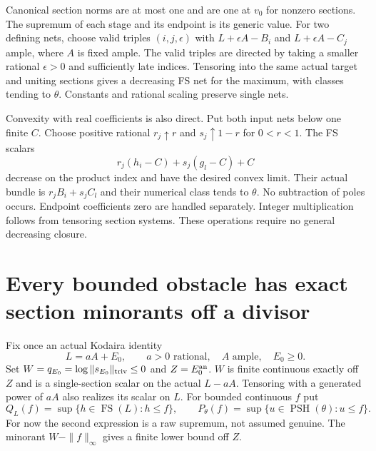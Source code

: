 \documentclass[10pt]{article}
\newcommand{\PSH}{\operatorname{PSH}}
\newcommand{\FS}{\operatorname{FS}}
\begin{document}
Canonical section norms are at most one and are one at $v_0$ for nonzero
sections. The supremum of each stage and its endpoint is its generic value.
For two defining nets, choose valid triples $(i,j,\epsilon)$ with
$L+\epsilon A-B_i$ and $L+\epsilon A-C_j$ ample, where $A$ is fixed ample.
The valid triples are directed by taking a smaller rational $\epsilon>0$
and sufficiently late indices. Tensoring into the same actual target and
uniting sections gives a decreasing FS net for the maximum, with classes
tending to $\theta$. Constants and rational scaling preserve single nets.

Convexity with real coefficients is also direct. Put both input nets below
one finite $C$. Choose positive rational $r_j\uparrow r$ and
$s_j\uparrow1-r$ for $0<r<1$. The FS scalars
\[
 r_j(h_i-C)+s_j(g_l-C)+C
\]
decrease on the product index and have the desired convex limit. Their
actual bundle is $r_jB_i+s_jC_l$ and their numerical class tends to
$\theta$. No subtraction of poles occurs. Endpoint coefficients zero are
handled separately. Integer multiplication follows from tensoring section
systems. These operations require no general decreasing closure.

\section{Every bounded obstacle has exact section minorants off a divisor}
Fix once an actual Kodaira identity
\[
 L=aA+E_0,\qquad a>0\text{ rational},\quad A\text{ ample},\quad E_0\geq0.
\]
Set $W=q_{E_0}=\log\|s_{E_0}\|_{\rm triv}\leq0$ and
$Z=E_0^{\rm an}$. $W$ is finite continuous exactly off $Z$ and is a
single-section scalar on the actual $L-aA$. Tensoring with a generated
power of $aA$ also realizes its scalar on $L$.
For bounded continuous $f$ put
\[
 Q_L(f)=\sup\{h\in\FS(L):h\leq f\},\qquad
 P_\theta(f)=\sup\{u\in\PSH(\theta):u\leq f\}.
\]
For now the second expression is a raw supremum, not assumed genuine.
The minorant $W-\|f\|_\infty$ gives a finite lower bound off $Z$.
\end{document}
